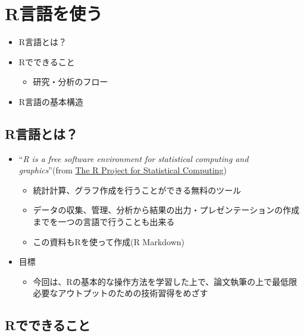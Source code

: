\documentclass[
]{ltjsarticle}
\providecommand{\tightlist}{%
  \setlength{\itemsep}{0pt}\setlength{\parskip}{0pt}}
\begin{document}
\hypertarget{rux8a00ux8a9eux3092ux4f7fux3046}{%
\section{R言語を使う}\label{rux8a00ux8a9eux3092ux4f7fux3046}}

\begin{itemize}
\tightlist
\item
  R言語とは？
\item
  Rでできること

  \begin{itemize}
  \tightlist
  \item
    研究・分析のフロー
  \end{itemize}
\item
  R言語の基本構造
\end{itemize}

\hypertarget{rux8a00ux8a9eux3068ux306f}{%
\subsection{R言語とは？}\label{rux8a00ux8a9eux3068ux306f}}

\begin{itemize}
\item
  ``\emph{R is a free software environment for statistical computing and
  graphics}''(from \href{https://www.r-project.org/}{The R Project for
  Statistical Computing})

  \begin{itemize}
  \tightlist
  \item
    統計計算、グラフ作成を行うことができる無料のツール
  \item
    データの収集、管理、分析から結果の出力・プレゼンテーションの作成までを一つの言語で行うことも出来る
  \item
    この資料もRを使って作成(R Markdown)
  \end{itemize}
\item
  目標

  \begin{itemize}
  \tightlist
  \item
    今回は、Rの基本的な操作方法を学習した上で、論文執筆の上で最低限必要なアウトプットのための技術習得をめざす
  \end{itemize}
\end{itemize}

\hypertarget{rux3067ux3067ux304dux308bux3053ux3068}{%
\subsection{Rでできること}\label{rux3067ux3067ux304dux308bux3053ux3068}}
\end{document}
